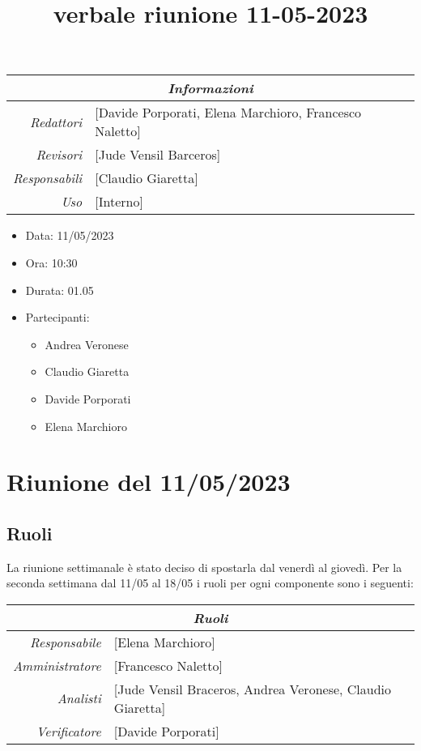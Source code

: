 \documentclass[12pt]{article}
\begin{document}
\graphicspath{ {../templates/img} }

\title{verbale riunione 11-05-2023}

\firstPage
\maketitle

\begin{center}
\begin{tabular}{r | l}
    \multicolumn{2}{c}{\textit{Informazioni}}\\
    \hline
    
        \textit{Redattori} &
        [Davide Porporati, Elena Marchioro, Francesco Naletto]\makecell{}\\
        \textit{Revisori} &
        [Jude Vensil Barceros]\makecell{}\\
        \textit{Responsabili} &
        [Claudio Giaretta]\makecell{}\\
            \textit{Uso} & 
            [Interno]\makecell{}\\
\end{tabular}
    \begin{itemize}
    \item[] Data: 11/05/2023
    \item[] Ora: 10:30
    \item[] Durata: 01.05
    \item[] Partecipanti:
    \begin{itemize}
    \item[] Andrea Veronese
    \item[] Claudio Giaretta
    \item[] Davide Porporati
    \item[] Elena Marchioro
    \end{itemize}
    \end{itemize}
\end{center}


\tableofcontents
\printindex 
\section{Riunione del 11/05/2023}
\subsection{Ruoli}
La riunione settimanale è stato deciso di spostarla dal venerdì al giovedì.
Per la seconda settimana dal 11/05 al 18/05 i ruoli per ogni componente sono i seguenti:
\\
\begin{tabular}{r | l}
    \multicolumn{2}{c}{\textit{Ruoli}}\\
    \hline
        \textit{Responsabile} &
        [Elena Marchioro]\makecell{}\\
        \textit{Amministratore} &
        [Francesco Naletto]\makecell{}\\
        \textit{Analisti} &
        [Jude Vensil Braceros, Andrea Veronese, Claudio Giaretta]\makecell{}\\
        \textit{Verificatore} & 
        [Davide Porporati]\makecell{}\\
\end{tabular}
\end{document}
